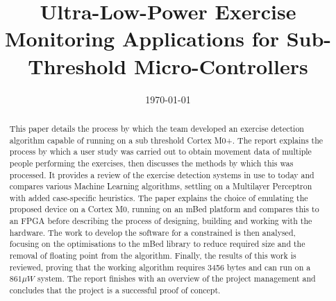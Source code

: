 \documentclass{.style/ecsgdp}         %
\begin{document}
	\frontmatter
	\title{Ultra-Low-Power Exercise Monitoring Applications for Sub-Threshold Micro-Controllers}
	\addresses  {\groupname\\\deptname\\\univname}
	\date       {\today}
	\subject    {}
	\keywords   {}
	\maketitle
	\begin{abstract}
		This paper details the process by which the team developed an exercise detection algorithm capable of running on a sub threshold Cortex M0+. The report explains the process by which a user study was carried out to obtain movement data of multiple people performing the exercises, then discusses the methods by which this was processed. It provides a review of the exercise detection systems in use to today and compares various Machine Learning algorithms, settling on a Multilayer Perceptron with added case-specific heuristics. The paper explains the choice of emulating the proposed device on a Cortex M0, running on an mBed platform and compares this to an FPGA before describing the process of designing, building and working with the hardware. The work to develop the software for a constrained is then analysed, focusing on the optimisations to the mBed library to reduce required size and the removal of floating point from the algorithm. Finally, the results of this work is reviewed, proving that the working algorithm requires 3456 bytes and can run on a $861 \mu W$ system. The report finishes with an overview of the project management and concludes that the project is a successful proof of concept.
	\end{abstract}
\end{document}
